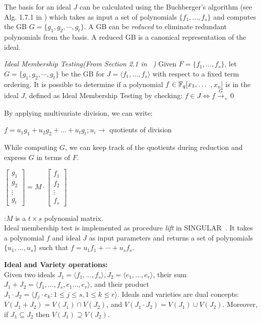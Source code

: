 The \Grobner basis for an ideal $J$ can be calculated using the 
Buchberger's algorithm (see Alg. 1.7.1 
in \cite{gb_book}) which takes as input a set of polynomials $\{f_1, 
\dots, f_s\}$ and computes the GB $G = \{g_1,g_2,\cdots,g_t\}$.
A GB can be {\it reduced} to eliminate
redundant polynomials from the basis. A reduced GB is a canonical
representation of the ideal. 

\begin{Lemma}
\label{lem:imt}
{\it Ideal Membership Testing(From Section 2.1 in ~\cite{gb_book})}
Given $F = \{f_1,\dots,f_s\}$, let $G = \{g_1,g_2,\cdots,g_t\}$ be the GB for
$J = \langle f_1,\dots,f_s\rangle$ with respect to a fixed term ordering.
It is possible to determine if a polynomial $f \in {\mathbb{F}}_q[x_1,\dots$ $,x_n]$ is
in the ideal $J$, defined as Ideal Membership Testing by checking: 
$f \in J \iff f \xrightarrow{G}_+ 0$

By applying multivariate division, we can write:

$f = u_1g_1 + u_2g_2+ \dots+ u_tg_t;u_i\rightarrow$ quotients of division

While computing $G$, we can keep track of the quotients during reduction and express $G$ in terms of $F$.

\begin{small}
$\begin{bmatrix} g_1 \\ g_2 \\ \vdots \\ g_t \end{bmatrix} = M \cdot
    \begin{bmatrix} f_1 \\ f_2 \\ \vdots \\ f_s \end{bmatrix}$
\end{small} 
:$M$ is a $t\times s$ polynomial matrix.\\
Ideal membership test is implemented as procedure {\it lift} in SINGULAR~\cite{DGPS_410}. 
It takes a polynomial $f$ and ideal $J$ as input parameters and returns a set of polynomials $\{u_1,\dots, u_s\}$ such that $f = u_1f_1 + \cdots + u_sf_s$. 
\end{Lemma}

{\bf Ideal and Variety operations:}\\ 
Given two ideals $J_1 = \langle f_1,\dots,f_s\rangle, J_2=\langle
e_1,\dots,e_r\rangle$, their sum $J_1 + J_2 = \langle
f_1,\dots,f_s,e_1\dots,e_r\rangle$, and their product $J_1\cdot J_2 =
\langle f_j\cdot e_k: 1\leq j\leq s, 1\leq k\leq r\rangle$. 
Ideals and
varieties are dual concepts: $V(J_1 + J_2) = V(J_1) \cap V(J_2)$, and
$V(J_1\cdot J_2) = V(J_1) \cup V(J_2)$. Moreover, if $J_1 \subseteq
J_2$ then $V(J_1)\supseteq V(J_2)$.

